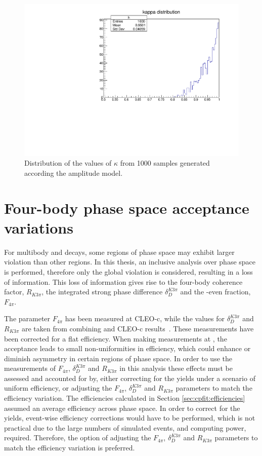 \begin{figure}[h]
\centering
\includegraphics[trim = 0mm 0mm 0mm 8mm, clip, width=0.5\linewidth]{figures/results/kappa.pdf}
\caption{Distribution of the values of $\kappa$ from 1000 samples generated according the amplitude model.}
\label{kappadistribution}
\end{figure}

\section{Four-body phase space acceptance variations}
\label{sec:interpretation:inputs}

For multibody \decay{\Dz}{\Kmp\pipm\pimp\pipm} and \decay{\Dz}{\pip\pim\pip\pim} decays, some regions of phase space may exhibit larger \CP violation than other regions. In this thesis, an inclusive analysis over phase space is performed, therefore only the global \CP violation is considered, resulting in a loss of information. This loss of information gives rise to the four-body coherence factor, $R_{K3\pi}$, the integrated strong phase difference $\delta_D^{K3\pi}$ and the \CP-even fraction, $F_{4\pi}$.

The parameter $F_{4\pi}$ has been measured at CLEO-c, while the values for $\delta_D^{K3\pi}$ and $R_{K3\pi}$ are taken from combining \lhcb and CLEO-c results~\cite{charmk3pi,charmk3pi_errata,LHCb-PAPER-2015-057,charm4pi}. These measurements have been corrected for a flat efficiency. When making measurements at \lhcb, the \lhcb acceptance leads to small non-uniformities in efficiency, which could enhance or diminish asymmetry in certain regions of phase space. In order to use the measurements of $F_{4\pi}$, $\delta_D^{K3\pi}$ and $R_{K3\pi}$ in this analysis these effects must be assessed and accounted for by, either correcting for the \lhcb yields under a scenario of uniform efficiency, or adjusting the $F_{4\pi}$, $\delta_D^{K3\pi}$ and $R_{K3\pi}$ parameters to match the \lhcb efficiency variation. The efficiencies calculated in Section \ref{sec:cpfit:efficiencies} assumed an average efficiency across phase space. In order to correct for the \lhcb yields, event-wise efficiency corrections would have to be performed, which is not practical due to the large numbers of simulated events, and computing power, required. Therefore, the option of adjusting the $F_{4\pi}$, $\delta_D^{K3\pi}$ and $R_{K3\pi}$ parameters to match the \lhcb efficiency variation is preferred.

